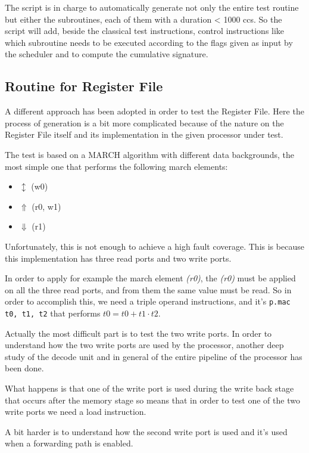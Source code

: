 \documentclass[paper=a4, fontsize=10pt]{scrartcl}	%
\begin{document}
	The script is in charge to automatically generate not only the entire test routine but either the subroutines, each of them with a duration < 1000 ccs. So the script will add, beside the classical test instructions, control instructions like which subroutine needs to be executed according to the flags given as input by the scheduler and to compute the cumulative signature.

	\subsection{Routine for Register File}
	A different approach has been adopted in order to test the Register File. Here the process of generation is a bit more complicated because of the nature on the Register File itself and its implementation in the given processor under test.

	The test is based on a MARCH algorithm with different data backgrounds, the most simple one that performs the following march elements:

	\begin{itemize}
		\itemsep0sp
		\item $\updownarrow$ (w0)
		\item $\Uparrow$ (r0, w1)
		\item $\Downarrow$ (r1)
	\end{itemize}

	Unfortunately, this is not enough to achieve a high fault coverage. This is because this implementation has three read ports and two write ports. 
	
	In order to apply for example the march element \textit{(r0)}, the \textit{(r0)} must be applied on all the three read ports, and from them the same value must be read. So in order to accomplish this, we need a triple operand instructions, and it's \texttt{p.mac t0, t1, t2} that performs $t0 = t0 + t1 \cdot t2$.\newline

	Actually the most difficult part is to test the two write ports. In order to understand how the two write ports are used by the processor, another deep study of the decode unit and in general of the entire pipeline of the processor has been done. 
	
	What happens is that one of the write port is used during the write back stage that occurs after the memory stage so means that in order to test one of the two write ports we need a load instruction. 

	A bit harder is to understand how the second write port is used and it's used when a forwarding path is enabled. \newline
\end{document}
